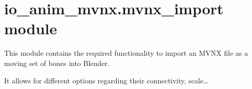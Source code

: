 \documentclass[letterpaper,10pt,english,openany,oneside]{sphinxmanual}
\begin{document}
\section{io\_anim\_mvnx.mvnx\_import module}
\label{\detokenize{io_anim_mvnx:module-io_anim_mvnx.mvnx_import}}\label{\detokenize{io_anim_mvnx:io-anim-mvnx-mvnx-import-module}}
This module contains the required functionality to import an MVNX file as a
moving set of bones into Blender.

It allows for different options regarding their connectivity, scale…
\end{document}
